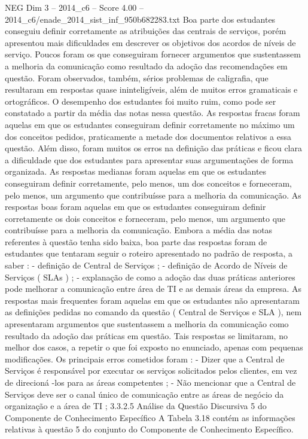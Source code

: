 \begin{textsample}{NEG Dim 3 – 2014\_c6 – Score 4.00 – 2014\_c6/enade\_2014\_sist\_inf\_950b682283.txt}
Boa parte dos estudantes conseguiu definir corretamente as atribuições das centrais de serviços, porém apresentou mais dificuldades em descrever os objetivos dos acordos de níveis de serviço.
Poucos foram os que conseguiram fornecer argumentos que sustentassem a melhoria da comunicação como resultado da adoção das recomendações em questão.
Foram observados, também, sérios problemas de caligrafia, que resultaram em respostas quase ininteligíveis, além de muitos erros gramaticais e ortográficos.
O desempenho dos estudantes foi muito ruim, como pode ser constatado a partir da média das notas nessa questão.
As respostas fracas foram aquelas em que os estudantes conseguiram definir corretamente no máximo um dos conceitos pedidos, praticamente a metade dos documentos relativos a essa questão.
Além disso, foram muitos os erros na definição das práticas e ficou clara a dificuldade que dos estudantes para apresentar suas argumentações de forma organizada.
As respostas medianas foram aquelas em que os estudantes conseguiram definir corretamente, pelo menos, um dos conceitos e forneceram, pelo menos, um argumento que contribuísse para a melhoria da comunicação.
As respostas boas foram aquelas em que os estudantes conseguiram definir corretamente os dois conceitos e forneceram, pelo menos, um argumento que contribuísse para a melhoria da comunicação.
Embora a média das notas referentes à questão tenha sido baixa, boa parte das respostas foram de estudantes que tentaram seguir o roteiro apresentado no padrão de resposta, a saber : - definição de Central de Serviços ; - definição de Acordo de Níveis de Serviços ( SLAs ) ; - explanação de como a adoção das duas práticas anteriores pode melhorar a comunicação entre área de TI e as demais áreas da empresa.
As respostas mais frequentes foram aquelas em que os estudantes não apresentaram as definições pedidas no comando da questão ( Central de Serviços e SLA ), nem apresentaram argumentos que sustentassem a melhoria da comunicação como resultado da adoção das práticas em questão.
Tais respostas se limitaram, no melhor dos casos, a repetir o que foi exposto no enunciado, apenas com pequenas modificações.
Os principais erros cometidos foram : - Dizer que a Central de Serviços é responsável por executar os serviços solicitados pelos clientes, em vez de direcioná -los para as áreas competentes ; - Não mencionar que a Central de Serviços deve ser o canal único de comunicação entre as áreas de negócio da organização e a área de TI ; 3.3.2.5 Análise da Questão Discursiva 5 do Componente de Conhecimento Específico A Tabela 3.18 contém as informações relativas à questão 5 do conjunto do Componente de Conhecimento Específico.

\end{textsample}
